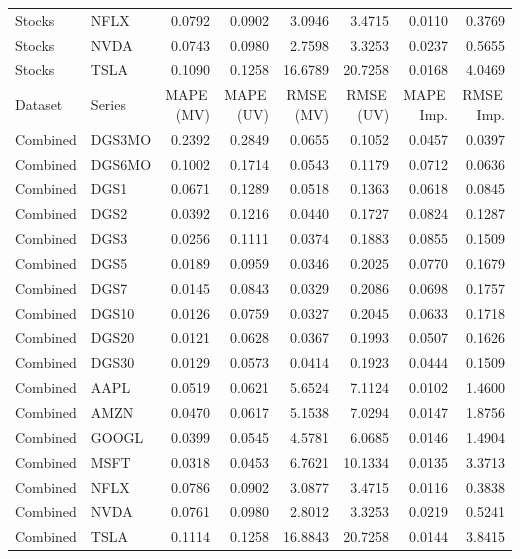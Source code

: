 \documentclass[twocolumn]{article}
\begin{document}
\begin{table}
{\begin{tabular}{llrrrrrr}
Stocks & NFLX  & 0.0792 & 0.0902 & 3.0946  & 3.4715  & 0.0110 & 0.3769 \\
Stocks & NVDA  & 0.0743 & 0.0980 & 2.7598  & 3.3253  & 0.0237 & 0.5655 \\
Stocks & TSLA  & 0.1090 & 0.1258 & 16.6789 & 20.7258 & 0.0168 & 4.0469 \\
\bottomrule
Dataset & Series & MAPE\,(MV) & MAPE\,(UV) & RMSE\,(MV) & RMSE\,(UV) & MAPE\,Imp. & RMSE\,Imp. \\
\midrule
Combined & DGS3MO & 0.2392 & 0.2849  & 0.0655  & 0.1052  & 0.0457  & 0.0397  \\
Combined & DGS6MO & 0.1002 & 0.1714  & 0.0543  & 0.1179  & 0.0712  & 0.0636  \\
Combined & DGS1    & 0.0671 & 0.1289  & 0.0518  & 0.1363  & 0.0618  & 0.0845  \\
Combined & DGS2    & 0.0392 & 0.1216  & 0.0440  & 0.1727  & 0.0824  & 0.1287  \\
Combined & DGS3    & 0.0256 & 0.1111  & 0.0374  & 0.1883  & 0.0855  & 0.1509  \\
Combined & DGS5    & 0.0189 & 0.0959  & 0.0346  & 0.2025  & 0.0770  & 0.1679  \\
Combined & DGS7    & 0.0145 & 0.0843  & 0.0329  & 0.2086  & 0.0698  & 0.1757  \\
Combined & DGS10  & 0.0126 & 0.0759  & 0.0327  & 0.2045  & 0.0633  & 0.1718  \\
Combined & DGS20  & 0.0121 & 0.0628  & 0.0367  & 0.1993  & 0.0507  & 0.1626  \\
Combined & DGS30  & 0.0129 & 0.0573  & 0.0414  & 0.1923  & 0.0444  & 0.1509  \\
\midrule
Combined & AAPL    & 0.0519 & 0.0621  & 5.6524  & 7.1124  & 0.0102  & 1.4600  \\
Combined & AMZN    & 0.0470 & 0.0617  & 5.1538  & 7.0294  & 0.0147  & 1.8756  \\
Combined & GOOGL   & 0.0399 & 0.0545  & 4.5781  & 6.0685  & 0.0146  & 1.4904  \\
Combined & MSFT    & 0.0318 & 0.0453  & 6.7621  & 10.1334 & 0.0135  & 3.3713  \\
Combined & NFLX    & 0.0786 & 0.0902  & 3.0877  & 3.4715  & 0.0116  & 0.3838  \\
Combined & NVDA    & 0.0761 & 0.0980  & 2.8012  & 3.3253  & 0.0219  & 0.5241  \\
Combined & TSLA    & 0.1114 & 0.1258  & 16.8843 & 20.7258 & 0.0144  & 3.8415 \\
\bottomrule
\end{tabular}
}
\end{table}
\end{document}
